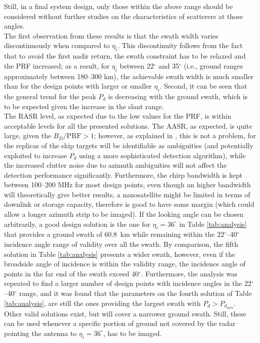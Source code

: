 \documentclass[conference,a4paper]{IEEEtran}
\begin{document}
    Still, in a final system design, only those within the above range should be considered without further studies on the characteristics of scatterers at those angles.\\
    The first observation from these results is that the swath width varies discontinuously when compared to $\eta_i$.
    This discontinuity follows from the fact that to avoid the first nadir return, the swath constraint has to be relaxed and the PRF increased;
    as a result, for $\eta_i$ between 22$^\circ$ and 35$^\circ$ (i.e., ground ranges approximately between 180--300 km), the achievable swath width is much smaller than for the design points with larger or smaller $\eta_i$.
    Second, it can be seen that the general trend for the peak $P_d$ is decreasing with the ground swath, which is to be expected given the increase in the slant range.\\
    The RASR level, as expected due to the low values for the PRF, is within acceptable levels for all the presented solutions.
    The AASR, as expected, is quite large, given the $B_D/\text{PRF}>1$; however, as explained in \cite{DLRjournal}, this is not a problem, for the replicas of the ship targets will be identifiable as ambiguities (and potentially exploited to increase $P_d$ using a more sophisticated detection algorithm), while the increased clutter noise due to azimuth ambiguities will not affect the detection performance significantly.
    Furthermore, the chirp bandwidth is kept between 100--200 MHz for most design points, even though an higher bandwidth will theoretically give better results, a nanosatellite might be limited in terms of downlink or storage capacity, therefore is good to have some margin (which could allow a longer azimuth strip to be imaged).
    If the looking angle can be chosen arbitrarily, a good design solution is the one for $\eta_i=36^\circ$ in Table \ref{tab:analysis} that provides a ground swath of 60.8~km while remaining within the 22$^\circ$--40$^\circ$ incidence angle range of validity over all the swath.
    By comparison, the fifth solution in Table \ref{tab:analysis} presents a wider swath, however, even if the broadside angle of incidence is within the validity range, the incidence angle of points in the far end of the swath exceed 40$^\circ$.
    Furthermore, the analysis was repeated to find a larger number of design points with incidence angles in the 22$^\circ$--40$^\circ$ range, and it was found that the parameters on the fourth solution of Table \ref{tab:analysis}, are still the ones providing the largest swath with $P_d>P_{d_{min}}$.
    Other valid solutions exist, but will cover a narrower ground swath.
    Still, these can be used whenever a specific portion of ground not covered by the radar pointing the antenna to $\eta_i=36^\circ$, has to be imaged.
\end{document}

